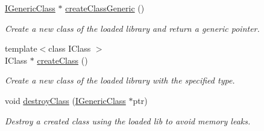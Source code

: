 \begin{DoxyCompactItemize}
\item 
\hyperlink{classow__core_1_1IGenericClass}{I\+Generic\+Class} $\ast$ \hyperlink{classow__plugin__loader_1_1ClassLoader_a6091dfbec7f40133d6308c8944f593e4}{create\+Class\+Generic} ()\hypertarget{classow__plugin__loader_1_1ClassLoader_a6091dfbec7f40133d6308c8944f593e4}{}\label{classow__plugin__loader_1_1ClassLoader_a6091dfbec7f40133d6308c8944f593e4}

\begin{DoxyCompactList}\small\item\em Create a new class of the loaded library and return a generic pointer. \end{DoxyCompactList}\item 
{\footnotesize template$<$class I\+Class $>$ }\\I\+Class $\ast$ \hyperlink{classow__plugin__loader_1_1ClassLoader_abe9d08376bad4a1530bc0e7a03334387}{create\+Class} ()
\begin{DoxyCompactList}\small\item\em Create a new class of the loaded library with the specified type. \end{DoxyCompactList}\item 
void \hyperlink{classow__plugin__loader_1_1ClassLoader_a3a5641de8591671332143c94e1700f3f}{destroy\+Class} (\hyperlink{classow__core_1_1IGenericClass}{I\+Generic\+Class} $\ast$ptr)
\begin{DoxyCompactList}\small\item\em Destroy a created class using the loaded lib to avoid memory leaks. \end{DoxyCompactList}\end{DoxyCompactItemize}

